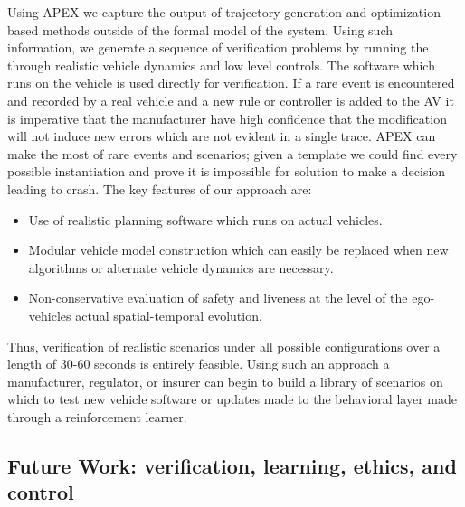  Using APEX we capture the output of trajectory generation and optimization based methods outside of the formal model of the system. Using such information, we generate a sequence of verification problems by running the through realistic vehicle dynamics and low level controls. The software which runs on the vehicle is used directly for verification. If a rare event is encountered and recorded by a real vehicle and a new rule or controller is added to the AV it is imperative that the manufacturer have high confidence that the modification will not induce new errors which are not evident in a single trace. APEX can make the most of rare events and scenarios; given a template we could find every possible instantiation and prove it is impossible for solution to make a decision leading to crash. The key features of our approach are:
 \begin{itemize}
 	\item Use of realistic planning software which runs on actual vehicles.
 	\item Modular vehicle model construction which can easily be replaced when new algorithms or alternate vehicle dynamics are necessary.
 	\item Non-conservative evaluation of safety and liveness at the level of the ego-vehicles actual spatial-temporal evolution. 
 \end{itemize}
 
 Thus, verification of realistic scenarios under all possible configurations over a length of 30-60 seconds is entirely feasible. Using such an approach a manufacturer, regulator, or insurer can begin to build a library of scenarios on which to test new vehicle software or updates made to the behavioral layer made through a reinforcement learner.
 
 \subsection{Future Work: verification, learning, ethics, and control}
 

